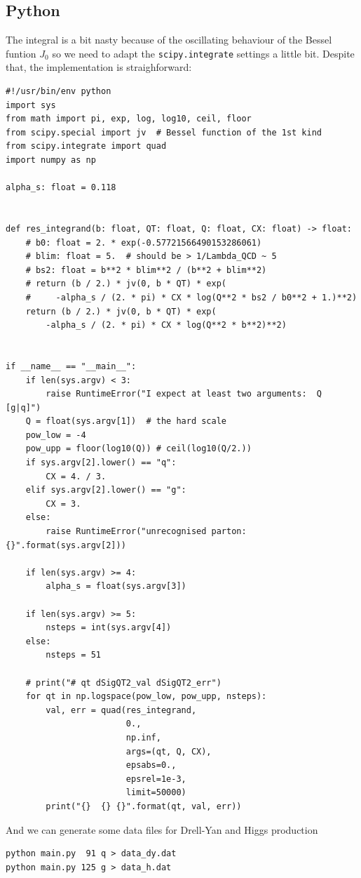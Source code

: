 \documentclass[11pt]{article}
\begin{document}
\subsection{Python}
\label{sec:orgeafe137}
The integral is a bit nasty because of the oscillating behaviour of the Bessel funtion \(J_0\) so we need to adapt the \texttt{scipy.integrate} settings a little bit.
Despite that, the implementation is straighforward:
\begin{verbatim}
#!/usr/bin/env python
import sys
from math import pi, exp, log, log10, ceil, floor
from scipy.special import jv  # Bessel function of the 1st kind
from scipy.integrate import quad
import numpy as np

alpha_s: float = 0.118


def res_integrand(b: float, QT: float, Q: float, CX: float) -> float:
    # b0: float = 2. * exp(-0.57721566490153286061)
    # blim: float = 5.  # should be > 1/Lambda_QCD ~ 5
    # bs2: float = b**2 * blim**2 / (b**2 + blim**2)
    # return (b / 2.) * jv(0, b * QT) * exp(
    #     -alpha_s / (2. * pi) * CX * log(Q**2 * bs2 / b0**2 + 1.)**2)
    return (b / 2.) * jv(0, b * QT) * exp(
        -alpha_s / (2. * pi) * CX * log(Q**2 * b**2)**2)


if __name__ == "__main__":
    if len(sys.argv) < 3:
        raise RuntimeError("I expect at least two arguments:  Q [g|q]")
    Q = float(sys.argv[1])  # the hard scale
    pow_low = -4
    pow_upp = floor(log10(Q)) # ceil(log10(Q/2.))
    if sys.argv[2].lower() == "q":
        CX = 4. / 3.
    elif sys.argv[2].lower() == "g":
        CX = 3.
    else:
        raise RuntimeError("unrecognised parton: {}".format(sys.argv[2]))

    if len(sys.argv) >= 4:
        alpha_s = float(sys.argv[3])

    if len(sys.argv) >= 5:
        nsteps = int(sys.argv[4])
    else:
        nsteps = 51

    # print("# qt dSigQT2_val dSigQT2_err")
    for qt in np.logspace(pow_low, pow_upp, nsteps):
        val, err = quad(res_integrand,
                        0.,
                        np.inf,
                        args=(qt, Q, CX),
                        epsabs=0.,
                        epsrel=1e-3,
                        limit=50000)
        print("{}  {} {}".format(qt, val, err))
\end{verbatim}

And we can generate some data files for Drell-Yan and Higgs production
\begin{verbatim}
python main.py  91 q > data_dy.dat
python main.py 125 g > data_h.dat
\end{verbatim}
\end{document}
